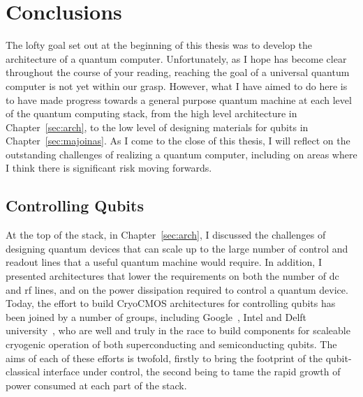 \chapter{Conclusions}

The lofty goal set out at the beginning of this thesis was to develop the architecture of a quantum computer. Unfortunately,
as I hope has become clear throughout the course of your reading, reaching the goal of a universal quantum computer
is not yet within our grasp. However, what I have aimed to do here is to have made progress towards a general purpose quantum machine at each
level of the quantum computing stack, from the high level architecture in Chapter~\ref{sec:arch}, to the low level
of designing materials for qubits in Chapter~\ref{sec:majoinas}. As I come to the close of this thesis, I will reflect on the outstanding
challenges of realizing a quantum computer, including on areas where I think there is significant risk moving forwards.

\section{Controlling Qubits}
At the top of the stack, in Chapter~\ref{sec:arch}, I discussed the challenges of designing quantum devices that can scale up to the large number of
control and readout lines that a useful quantum machine would require. In addition, I presented architectures that lower the
requirements on both the number of dc and rf lines, and on the power dissipation required to control a quantum device. Today, the effort to build
CryoCMOS architectures for controlling qubits has been joined by a number of groups, including Google~\cite{gcryocmos}, Intel and Delft university~\cite{VANDIJK201990},
who are well and truly in the race to build components for scaleable cryogenic operation of both superconducting and semiconducting qubits. The aims of each
of these efforts is twofold, firstly to bring the footprint of the qubit-classical interface under control, the second being
to tame the rapid growth of power consumed at each part of the stack.

